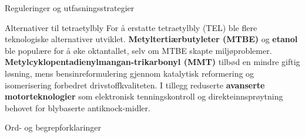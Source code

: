 \documentclass[final]{beamer}
\newlength{\colwidth}
\begin{document}
\begin{frame}[t]
\begin{columns}[t]
\begin{column}{\colwidth}
\begin{block}{Reguleringer og utfasningsstrategier}
			\end{block}

			\begin{block}{Alternativer til tetraetylbly}
				For å erstatte tetraetylbly (TEL) ble flere teknologiske alternativer utviklet.
				\textbf{Metyltertiærbutyleter (MTBE)} og \textbf{etanol} ble populære for å øke oktantallet,
				selv om MTBE skapte miljøproblemer. \textbf{Metylcyklopentadienylmangan-trikarbonyl (MMT)}
				tilbød en mindre giftig løsning, mens bensinreformulering gjennom katalytisk reformering og
				isomerisering forbedret drivstoffkvaliteten. I tillegg reduserte \textbf{avanserte
					motorteknologier} som elektronisk tenningskontroll og direkteinnsprøytning behovet for
				blybaserte antiknock-midler.
			\end{block}

			\begin{block}{Ord- og begrepforklaringer}


				\begin{enumerate}


\end{enumerate}
\end{block}
\end{column}
\end{columns}
\end{frame}
\end{document}
